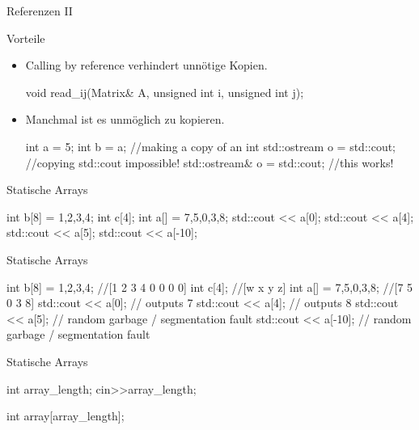 \ifnum\conditionmacro=1 \documentclass[handout,usenames,dvipsnames]{beamer}\fi
\begin{document}
\begin{frame}[fragile]{Referenzen II}
\begin{block}{Vorteile}
\begin{itemize}
\item Calling by reference verhindert unnötige Kopien.

\begin{TPCpp}
void read_ij(Matrix& A, unsigned int i, unsigned int j);
\end{TPCpp}
\item Manchmal ist es unmöglich zu kopieren.

\begin{TPCpp}
int a = 5;
int b = a; //making a copy of an int
std::ostream o = std::cout; 
//copying std::cout impossible!
std::ostream& o = std::cout; //this works!
\end{TPCpp}
\end{itemize}
\end{block}
\end{frame}

\begin{frame}[fragile]{Statische Arrays}
\begin{TFCpp}
int b[8] = {1,2,3,4};
int c[4];
int a[] = {7,5,0,3,8};
std::cout << a[0];
std::cout << a[4];
std::cout << a[5];
std::cout << a[-10];
\end{TFCpp}
\end{frame}

\begin{frame}[fragile]{Statische Arrays}
\begin{TFCpp}
int b[8] = {1,2,3,4};  //[1 2 3 4 0 0 0 0]
int c[4]; //[w x y z] 
int a[] = {7,5,0,3,8}; //[7 5 0 3 8]
std::cout << a[0]; // outputs 7
std::cout << a[4]; // outputs 8
std::cout << a[5]; // random garbage / segmentation fault
std::cout << a[-10]; // random garbage / segmentation fault
\end{TFCpp}
\end{frame}

\begin{frame}[fragile]{Statische Arrays}
\begin{TFCpp}
int array_length;
cin>>array_length;

int array[array_length];
\end{TFCpp}
\end{frame}

\end{document}
